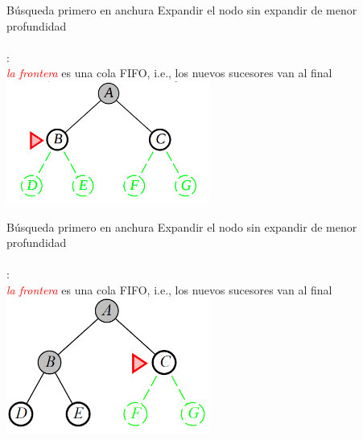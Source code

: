 \documentclass{beamer}
\theoremstyle{definition}
\theoremstyle{theorem}
\theoremstyle{remark}
\begin{document}
\begin{frame}{B\'usqueda primero en anchura}
    Expandir el nodo sin expandir de menor profundidad\\~\\
    :\\
    \quad\textcolor{red}{\textit{la frontera}} es una cola FIFO, i.e., los nuevos sucesores van al final
    \centering
    \includegraphics[width=0.5\textwidth]{34_image_bfs2.PNG}
    
\end{frame}


\begin{frame}{B\'usqueda primero en anchura}
    Expandir el nodo sin expandir de menor profundidad\\~\\
    :\\
    \quad\textcolor{red}{\textit{la frontera}} es una cola FIFO, i.e., los nuevos sucesores van al final
    \centering
    \includegraphics[width=0.5\textwidth]{35_image_bfs2.PNG}
    
\end{frame}
\end{document}
